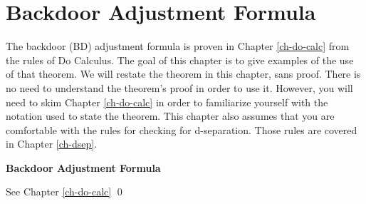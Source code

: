 \chapter{Backdoor Adjustment Formula}
\label{ch-bdoor}

The backdoor (BD) adjustment
formula is proven in
Chapter \ref{ch-do-calc}
from the rules of Do Calculus.
The goal 
of this chapter is
to give examples
of the use of that
theorem.
We will restate
the theorem in this chapter,
sans proof.
There is no need
to understand the
theorem's
proof in order to use it.
However, you
will
need to skim Chapter \ref{ch-do-calc}
in order to familiarize 
yourself with
the notation used to state the 
theorem.
This chapter also assumes
that you are comfortable 
with the  rules 
for checking for d-separation. Those rules
are covered in Chapter \ref{ch-dsep}.



\bdoordef
\begin{claim} {\bf Backdoor Adjustment
 Formula}

\bdoorclaim
\end{claim}
\proof 
See Chapter \ref{ch-do-calc}
\qed


